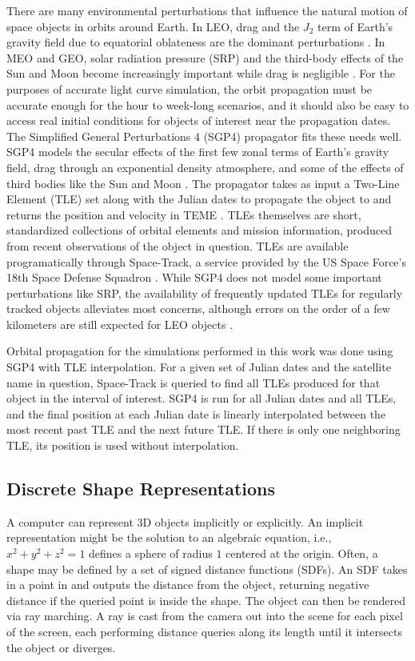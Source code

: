 There are many environmental perturbations that influence the natural motion of space objects in orbits around Earth. In LEO, drag and the $J_2$ term of Earth's gravity field due to equatorial oblateness are the dominant perturbations \cite{frueh2019notes}. In MEO and GEO, solar radiation pressure (SRP) and the third-body effects of the Sun and Moon become increasingly important while drag is negligible \cite{frueh2019notes}. For the purposes of accurate light curve simulation, the orbit propagation must be accurate enough for the hour to week-long scenarios, and it should also be easy to access real initial conditions for objects of interest near the propagation dates. The Simplified General Perturbations 4 (SGP4) propagator fits these needs well. SGP4 models the secular effects of the first few zonal terms of Earth's gravity field, drag through an exponential density atmosphere, and some of the effects of third bodies like the Sun and Moon \cite{vallado4ed}. The propagator takes as input a Two-Line Element (TLE) set along with the Julian dates to propagate the object to and returns the position and velocity in TEME \cite{vallado4ed}. TLEs themselves are short, standardized collections of orbital elements and mission information, produced from recent observations of the object in question. TLEs are available programatically through Space-Track, a service provided by the US Space Force's 18th Space Defense Squadron \cite{spacetrack}. While SGP4 does not model some important perturbations like SRP, the availability of frequently updated TLEs for regularly tracked objects alleviates most concerns, although errors on the order of a few kilometers are still expected for LEO objects \cite{vallado4ed}. 

Orbital propagation for the simulations performed in this work was done using SGP4 with TLE interpolation. For a given set of Julian dates and the satellite name in question, Space-Track is queried to find all TLEs produced for that object in the interval of interest. SGP4 is run for all Julian dates and all TLEs, and the final position at each Julian date is linearly interpolated between the most recent past TLE and the next future TLE. If there is only one neighboring TLE, its position is used without interpolation.

\subsection{Discrete Shape Representations}

A computer can represent 3D objects implicitly or explicitly. An implicit representation might be the solution to an algebraic equation, i.e., $x^2 + y^2 + z^2 = 1$ defines a sphere of radius $1$ centered at the origin. Often, a shape may be defined by a set of signed distance functions (SDFs). An SDF takes in a point in \rthree and outputs the distance from the object, returning negative distance if the queried point is inside the shape. The object can then be rendered via ray marching. A ray is cast from the camera out into the scene for each pixel of the screen, each performing distance queries along its length until it intersects the object or diverges. 

